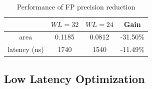 \begin{table}[h!]
    \centering
    \begin{tabular}{c|c|c|c}
    \hline
        & $WL=32$ & $WL=24$ &  Gain \\
        \hline
   area &  0.1185  & 0.0812   & -31.50\% \\ 
latency (ns) &  1740 &  1540  & -11.49\% \\
    \hline
    \end{tabular}
    \caption{Performance of FP precision reduction}
    \label{tab-3}
\end{table}

\subsection{Low Latency Optimization}

